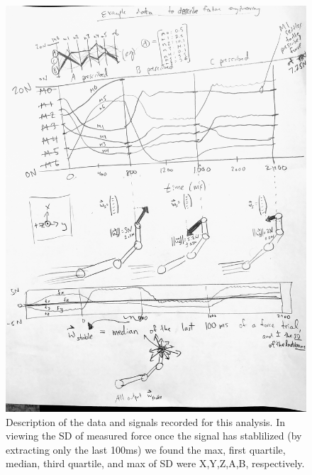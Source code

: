 \documentclass[utf8]{frontiersSCNS} %
\begin{document}
\begin{figure}[h!]
\begin{center}
\includegraphics[width=17.5cm]{figures/data_description/data_description.jpg}%
\end{center}
\caption{Description of the data and signals recorded for this analysis. In viewing the SD of measured force once the signal has stablilized (by extracting only the last 100ms) we found the max, first quartile, median, third quartile, and max of SD were X,Y,Z,A,B, respectively.}
\label{fig:data_description}
\end{figure}
\end{document}
